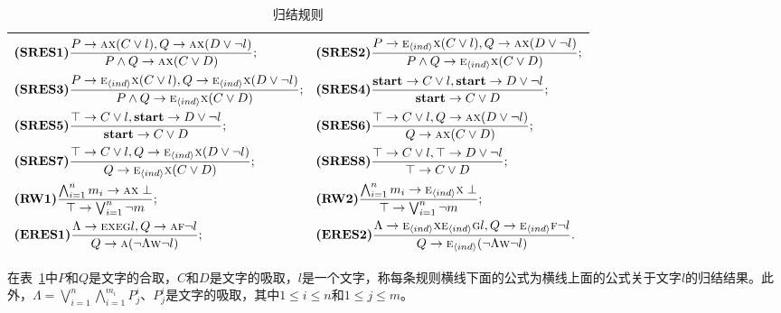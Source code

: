 \begin{table}[tb]%
	\small
	\centering
	\caption{归结规则}\label{tab:res}
	\begin{tabular}{l}
		\toprule
		$
		\begin{aligned}
			& \textbf{(SRES1)}\frac{P\rightarrow \textsc{a}\textsc{x}(C\vee l), Q\rightarrow \textsc{a}\textsc{x}(D\vee \neg l)}{P\wedge Q \rightarrow \textsc{a}\textsc{x}(C\vee D)};
			&& \textbf{(SRES2)} \frac{P\rightarrow \textsc{e}_{{\langle{ind}\rangle}} \textsc{x}(C\vee l), Q\rightarrow \textsc{a}\textsc{x}(D\vee \neg l)}{P\wedge Q \rightarrow \textsc{e}_{{\langle{ind}\rangle}}\textsc{x}(C\vee D)};\\
			& \textbf{(SRES3)} \frac{P\rightarrow \textsc{e}_{{\langle{ind}\rangle}}\textsc{x}(C\vee l), Q \rightarrow \textsc{e}_{{\langle{ind}\rangle}}\textsc{x}(D\vee \neg l)}{P\wedge Q\rightarrow\textsc{e}_{{\langle{ind}\rangle}}\textsc{x}(C\vee D)};  
			&&   \textbf{(SRES4)} \frac{\textbf{start} \rightarrow C\vee l, \textbf{start} \rightarrow D \vee \neg l}{\textbf{start} \rightarrow C\vee D}; \\
			& \textbf{(SRES5)} \frac{\top \rightarrow C\vee l, \textbf{start} \rightarrow D \vee \neg l}{\textbf{start} \rightarrow C \vee D};
			&&  \textbf{(SRES6)} \frac{\top \rightarrow C \vee l, Q \rightarrow \textsc{a}\textsc{x}(D \vee \neg l)}{Q\rightarrow \textsc{a} \textsc{x}(C\vee D)}; \\
			& \textbf{(SRES7)} \frac{\top \rightarrow C \vee l, Q \rightarrow \textsc{e}_{{\langle{ind}\rangle}} \textsc{x}(D \vee \neg l)}{Q\rightarrow \textsc{e}_{{\langle{ind}\rangle}}\textsc{x}(C\vee D)}; 
			&&  \textbf{(SRES8)} \frac{\top \rightarrow C\vee l, \top \rightarrow D \vee \neg l}{\top \rightarrow C \vee D};\\
			& \textbf{(RW1)} \frac{\bigwedge_{i=1}^n m_i \rightarrow \textsc{a}\textsc{x} \perp}{\top \rightarrow \bigvee_{i=1}^n \neg m}; 
			&& \textbf{(RW2)} \frac{\bigwedge_{i=1}^n m_i \rightarrow \textsc{e}_{{\langle{ind}\rangle}}\textsc{x} \perp}{\top \rightarrow \bigvee_{i=1}^n \neg m}; \\
			& \textbf{(ERES1)} \frac{\Lambda \rightarrow \textsc{e} \textsc{x} \textsc{e}\textsc{g} l, Q \rightarrow \textsc{a} \textsc{f} \neg l}{Q \rightarrow \textsc{a}(\neg \Lambda \textsc{w} \neg l)};
			&& \textbf{(ERES2)} \frac{\Lambda \rightarrow \textsc{e}_{{\langle{ind}\rangle}} \textsc{x} \textsc{e}_{{\langle{ind}\rangle}}\textsc{g} l, Q \rightarrow \textsc{e}_{{\langle{ind}\rangle}} \textsc{f} \neg l}{Q \rightarrow \textsc{e}_{{\langle{ind}\rangle}}(\neg \Lambda \textsc{w} \neg l)}.
		\end{aligned}
		$\\
		\bottomrule
	\end{tabular}
\end{table}
在表~\ref{tab:res}中$P$和$Q$是文字的合取，$C$和$D$是文字的吸取，$l$是一个文字，称每条规则横线下面的公式为横线上面的公式关于文字$l$的归结结果。此外，$\Lambda=\bigvee_{i=1}^n \bigwedge_{i=1}^{m_i}P_j^i$、$P_j^i$是文字的吸取，其中$1\leq i\leq n$和$1\leq j\leq m$。

